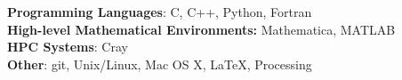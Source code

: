 \textbf{Programming Languages}: C, C++, Python, Fortran \\
\textbf{High-level Mathematical Environments:} Mathematica, MATLAB\\
\textbf{HPC Systems}: Cray \\
\textbf{Other}: git, Unix/Linux, Mac OS X, \LaTeX, Processing
